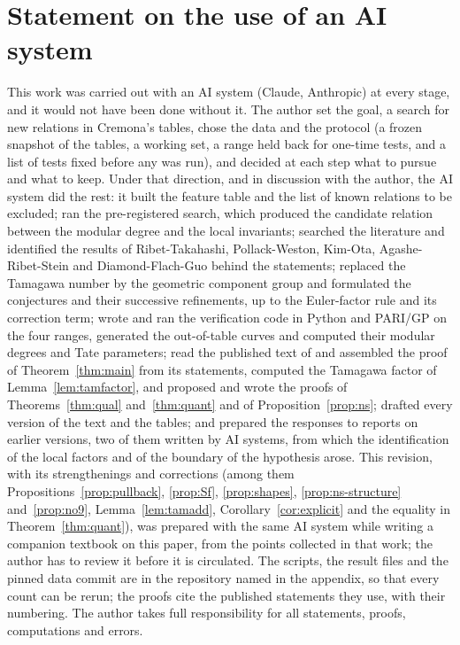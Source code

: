 \documentclass[11pt]{amsart}
\theoremstyle{definition}
\begin{document}
\section*{Statement on the use of an AI system}
This work was carried out with an AI system (Claude, Anthropic) at every stage, and it would not have been done without it. The author set the goal, a search for new relations in Cremona's tables, chose the data and the protocol (a frozen snapshot of the tables, a working set, a range held back for one-time tests, and a list of tests fixed before any was run), and decided at each step what to pursue and what to keep. Under that direction, and in discussion with the author, the AI system did the rest: it built the feature table and the list of known relations to be excluded; ran the pre-registered search, which produced the candidate relation between the modular degree and the local invariants; searched the literature and identified the results of Ribet-Takahashi, Pollack-Weston, Kim-Ota, Agashe-Ribet-Stein and Diamond-Flach-Guo behind the statements; replaced the Tamagawa number by the geometric component group and formulated the conjectures and their successive refinements, up to the Euler-factor rule and its correction term; wrote and ran the verification code in Python and PARI/GP on the four ranges, generated the out-of-table curves and computed their modular degrees and Tate parameters; read the published text of \cite{DFG04} and assembled the proof of Theorem~\ref{thm:main} from its statements, computed the Tamagawa factor of Lemma~\ref{lem:tamfactor}, and proposed and wrote the proofs of Theorems~\ref{thm:qual} and~\ref{thm:quant} and of Proposition~\ref{prop:ns}; drafted every version of the text and the tables; and prepared the responses to reports on earlier versions, two of them written by AI systems, from which the identification of the local factors and of the boundary of the hypothesis arose. This revision, with its strengthenings and corrections (among them Propositions~\ref{prop:pullback}, \ref{prop:Sf}, \ref{prop:shapes}, \ref{prop:ns-structure} and~\ref{prop:no9}, Lemma~\ref{lem:tamadd}, Corollary~\ref{cor:explicit} and the equality in Theorem~\ref{thm:quant}), was prepared with the same AI system while writing a companion textbook on this paper, from the points collected in that work; the author has to review it before it is circulated. The scripts, the result files and the pinned data commit are in the repository named in the appendix, so that every count can be rerun; the proofs cite the published statements they use, with their numbering. The author takes full responsibility for all statements, proofs, computations and errors.



\end{document}
